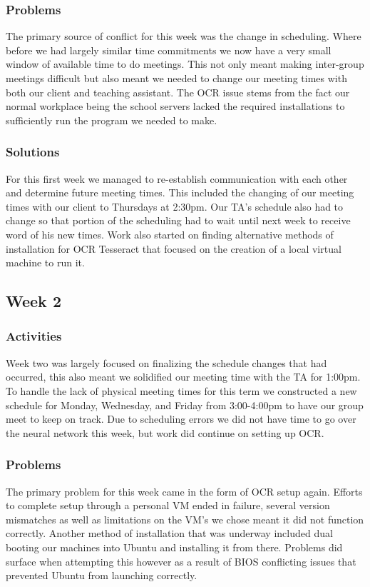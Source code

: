 \documentclass[onecolumn, draftclsnofoot,10pt, compsoc]{IEEEtran}
\begin{document}
\subsubsection{Problems}
The primary source of conflict for this week was the change in scheduling. Where before we had largely similar time commitments we now have a very small window of available time to do meetings. This not only meant making inter-group meetings difficult but also meant we needed to change our meeting times with both our client and teaching assistant. The OCR issue stems from the fact our normal workplace being the school servers lacked the required installations to sufficiently run the program we needed to make. 

\subsubsection{Solutions}
For this first week we managed to re-establish communication with each other and determine future meeting times. This included the changing of our meeting times with our client to Thursdays at 2:30pm. Our TA’s schedule also had to change so that portion of the scheduling had to wait until next week to receive word of his new times. Work also started on finding alternative methods of installation for OCR Tesseract that focused on the creation of a local virtual machine to run it.

\subsection{Week 2}
\subsubsection{Activities}
Week two was largely focused on finalizing the schedule changes that had occurred, this also meant we solidified our meeting time with the TA for 1:00pm. To handle the lack of physical meeting times for this term we constructed a new schedule for Monday, Wednesday, and Friday from 3:00-4:00pm to have our group meet to keep on track. Due to scheduling errors we did not have time to go over the neural network this week, but work did continue on setting up OCR. 

\subsubsection{Problems}
The primary problem for this week came in the form of OCR setup again. Efforts to complete setup through a personal VM ended in failure, several version mismatches as well as limitations on the VM’s we chose meant it did not function correctly. Another method of installation that was underway included dual booting our machines into Ubuntu and installing it from there. Problems did surface when attempting this however as a result of BIOS conflicting issues that prevented Ubuntu from launching correctly. 
\end{document}
